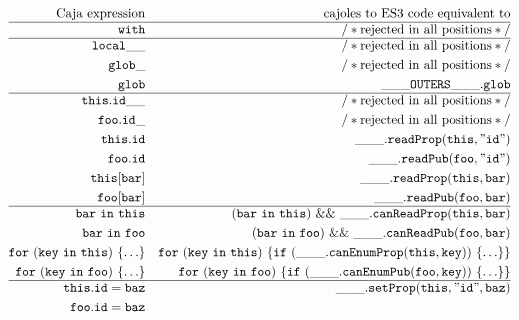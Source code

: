 \documentclass[letterpaper,twocolumn,10pt]{article}
\newcommand{\code}[1]{{\tt {#1}}}              %
\begin{document}
\begin{figure}
\begin{eqnarray}
  \mathrm{Caja\ expression} & \nonumber
      & \mathrm{cajoles\ to\ ES3\ code\ equivalent\ to} \\
  \hline
  \code{with}               & \label{with:bad}
      & \mathrm{/*rejected\ in\ all\ positions*/} \\
  \hline
  \code{local\_\_}          & \label{var:bad-suffix}
      & \mathrm{/*rejected\ in\ all\ positions*/} \\
  \code{glob\_}             & \label{var:bad-global-suffix}
      & \mathrm{/*rejected\ in\ all\ positions*/} \\
  \code{glob}               & \label{var:global}
      & \code{\_\_\_OUTERS\_\_\_.glob} \\
  \hline
  \code{this.id\_\_}        & \label{read:bad-suffix}
      & \mathrm{/*rejected\ in\ all\ positions*/} \\
  \code{foo.id\_}           & \label{read:bad-internal}
      & \mathrm{/*rejected\ in\ all\ positions*/} \\
  \code{this.id}            & \label{read:internal}
      & \code{\_\_\_.readProp(this,"id")} \\
  \code{foo.id}             & \label{read:public}
      & \code{\_\_\_.readPub(foo,"id")} \\
  \code{this[bar]}          & \label{read:index-internal}
      & \code{\_\_\_.readProp(this,bar)} \\
  \code{foo[bar]}           & \label{read:index-public}
      & \code{\_\_\_.readPub(foo,bar)} \\
  \hline
  \code{bar\ in\ this}      & \label{in:internal}
      & \code{(bar\ in\ this)\ \&\&\ \_\_\_.canReadProp(this,bar)} \\
  \code{bar\ in\ foo}       & \label{in:public}
      & \code{(bar\ in\ foo)\ \&\&\ \_\_\_.canReadPub(foo,bar)} \\
  \code{for\ (key\ in\ this)\ \{\ldots\}} & \label{for:internal}
      & \code{for\ (key\ in\ this)\
                \{if\ (\_\_\_.canEnumProp(this,key))\ \{\ldots\}\}}\\
  \code{for\ (key\ in\ foo)\ \{\ldots\}}  & \label{for:public}
      & \code{for\ (key\ in\ foo)\
                \{if\ (\_\_\_.canEnumPub(foo,key))\ \{\ldots\}\}} \\
  \hline
  \code{this.id = baz}      & \label{set:internal}
      & \code{\_\_\_.setProp(this,"id",baz)} \\
  \code{foo.id = baz}       & \label{set:public}

\end{eqnarray}
\end{figure}
\end{document}
